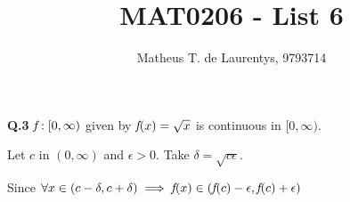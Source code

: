 \documentclass[12pt,twoside]{article}
\title{\vspace{-4.0cm}MAT0206 - List 6}
\author{Matheus T. de Laurentys, 9793714}
\newcommand{\f}{\mkern-2mu f\mkern-3mu}
\begin{document}
	\maketitle
	\noindent\textbf{Q.3} $\f :[0,\infty)$ given by $\f (x) = \sqrt{x}$ is continuous in $[0,\infty)$.
	
	Let $c$ in $(0, \infty)$ and $\epsilon > 0$. Take $\delta = \sqrt{c\epsilon}$.
	
	Since $\forall x \in (c - \delta, c + \delta) \implies \f (x) \in (\f (c) - \epsilon, \f (c) + \epsilon)$
\end{document}
